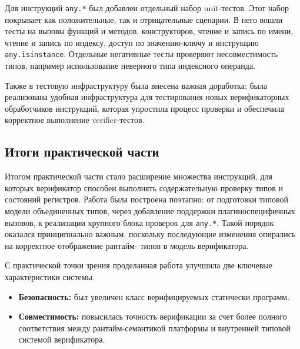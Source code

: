 Для инструкций \texttt{any.*} был добавлен отдельный набор unit-тестов. 
Этот набор покрывает как
положительные, так и отрицательные сценарии. В него вошли тесты на вызовы функций и методов,
конструкторов, чтение и запись по имени, чтение и запись по индексу, доступ по значению-ключу и
инструкцию \texttt{any.isinstance}. Отдельные негативные тесты проверяют несовместимость типов,
например использование неверного типа индексного операнда.

Также в тестовую инфраструктуру была внесена важная доработка: была реализована
удобная инфраструктура для тестирования новых верификаторных обработчиков инструкций, которая упростила
процесс проверки и обеспечила корректное выполнение verifier-тестов.

\subsection{Итоги практической части}

Итогом практической части стало расширение множества инструкций, для которых верификатор способен
выполнять содержательную проверку типов и состояний регистров. Работа была построена поэтапно: от
подготовки типовой модели объединенных типов, через добавление поддержки плагиноспецифичных
вызовов, к реализации крупного блока проверок для \texttt{any.*}. Такой порядок оказался
принципиально важным, поскольку последующие изменения опирались на корректное отображение рантайм-
типов в модель верификатора.

С практической точки зрения проделанная работа улучшила две ключевые характеристики системы.
\begin{itemize}
    \item \textbf{Безопасность:} был увеличен класс верифицируемых статически программ.
    \item \textbf{Совместимость:} повысилась точность верификации за счет более полного соответствия между рантайм-семантикой
платформы и внутренней типовой системой верификатора.
\end{itemize}
